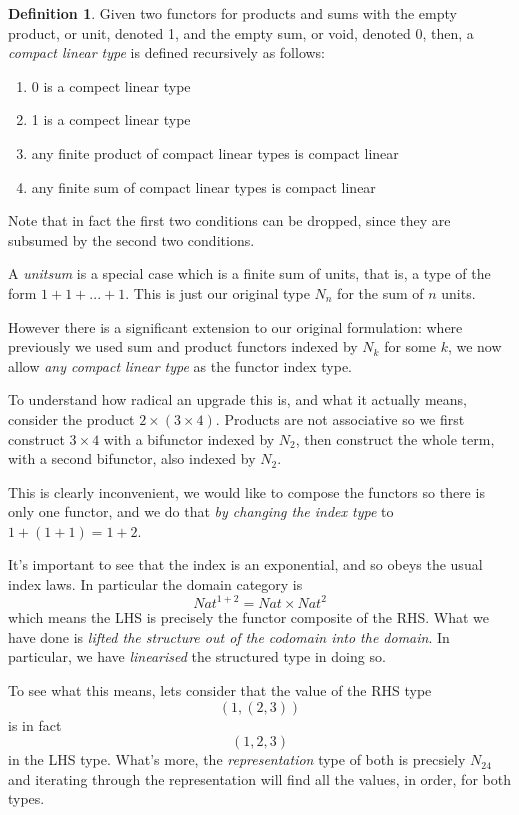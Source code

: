 \documentclass[oneside]{book}
\theoremstyle{plain}
\theoremstyle{definition}
\newtheorem{definition}{Definition}
\theoremstyle{plain}
\def\Nat{\mathit{Nat}}
\begin{document}
\begin{definition}
Given two functors for products and sums with the empty product, or unit,
denoted 1, and the empty sum, or void, denoted 0, then, a {\em compact
linear type} is defined recursively as follows:
\begin{enumerate}
\item 0 is a compect linear type
\item 1 is a compect linear type
\item any finite product of compact linear types is compact linear
\item any finite sum of compact linear types is compact linear
\end{enumerate}
Note that in fact the first two conditions can be dropped, since
they are subsumed by the second two conditions. 
\end{definition}

A {\em unitsum} is a special case which is a finite sum of units,
that is, a type of the form $1+1+...+1$. This is just our
original type $N_n$ for the sum of $n$ units.

However there is a significant extension to our original formulation:
where previously we used sum and product functors indexed by
$N_k$ for some $k$, we now allow {\em any compact linear type}
as the functor index type.

To understand how radical an upgrade this is, and what it actually
means, consider the product $2 \times (3 \times 4)$. Products are
not associative so we first construct $3\times4$ with a bifunctor
indexed by $N_2$, then construct the whole term, with a second
bifunctor, also indexed by $N_2$.

This is clearly inconvenient, we would like to compose the functors
so there is only one functor, and we do that {\em by changing
the index type} to $1+(1+1) = 1 + 2$.

It's important to see that the index is an exponential, and so obeys the
usual index laws. In particular the domain category is
$$\Nat^{1+2} = \Nat \times {\Nat^2}$$
which means the LHS is precisely the functor composite of the RHS.
What we have done is {\em lifted the structure out of the codomain
into the domain}. In particular, we have {\em linearised} the
structured type in doing so.

To see what this means, lets consider that the value of the RHS type
$$(1,(2,3))$$
is in fact
$$(1,2,3)$$
in the LHS type. What's more, the {\em representation} type of both
is precsiely $N_{24}$ and iterating through the representation will
find all the values, in order, for both types.
\end{document}

